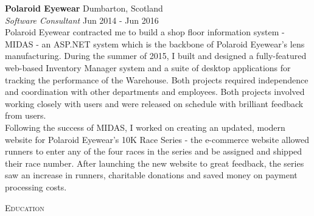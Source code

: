 \documentclass[a4paper]{article}
\newcommand{\lineunder} {
  \vspace*{-8pt} \\
  \hspace*{-18pt} \hrulefill \\
}
\newcommand{\header} [1] {
  {\hspace*{-18pt}\vspace*{6pt} \textsc{#1}}
  \vspace*{-6pt} \lineunder
}
\begin{document}
\textbf{Polaroid Eyewear} \hfill {\color{gray} Dumbarton, Scotland} \\
\textit{Software Consultant} \hfill {\color{gray} Jun 2014 - Jun 2016} \\
\vspace{2mm}
Polaroid Eyewear contracted me to build a shop floor information system - MIDAS - an ASP.NET
system which is the backbone of Polaroid Eyewear's lens manufacturing.
\vspace{2mm}
During the summer of 2015, I built and designed a fully-featured web-based Inventory Manager system
and a suite of desktop applications for tracking the performance of the Warehouse. Both projects
required independence and coordination with other departments and employees. Both projects involved
working closely with users and were released on schedule with brilliant feedback from users. \\
\vspace{2mm}
Following the success of MIDAS, I worked on creating an updated, modern website for Polaroid
Eyewear's 10K Race Series - the e-commerce website allowed runners to enter any of the four races
in the series and be assigned and shipped their race number. After launching the new website to
great feedback, the series saw an increase in runners, charitable donations and saved money on
payment processing costs.
\vspace{2mm}

\header{Education}
\vspace{1mm}
\end{document}
